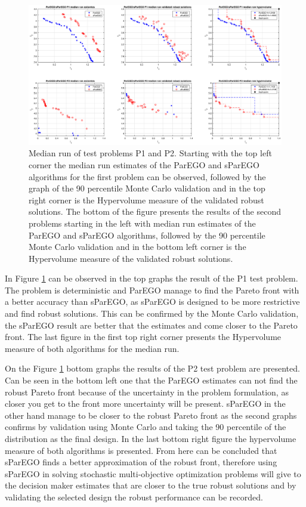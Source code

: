 \documentclass[10pt]{llncs}
\begin{document}
\begin{figure}[h]
\centering
\includegraphics[width=1.5\textwidth, center]{P1P2}
\caption{Median run of test problems P1 and P2. Starting with the top left corner the median run estimates of the ParEGO and sParEGO algorithms for the first problem can be observed, followed by the graph of the 90 percentile Monte Carlo validation and in the top right corner is the Hypervolume measure of the validated robust solutions. The bottom of the figure presents the results of the second problems starting in the left with median run estimates of the ParEGO and sParEGO algorithms, followed by the 90 percentile Monte Carlo validation and in the bottom left corner is the Hypervolume measure of the validated robust solutions.}
\label{fig:MedianRun}
\end{figure}

In Figure \ref{fig:MedianRun} can be observed in the top graphs the result of the P1 test problem. The problem is deterministic and ParEGO manage to find the Pareto front with a better accuracy than sParEGO, as sParEGO is designed to be more restrictive and find robust solutions. This can be confirmed by the Monte Carlo validation, the sParEGO result are better that the estimates and come closer to the Pareto front. The last figure in the first top right corner presents the Hypervolume measure of both algorithms for the median run.

On the Figure \ref{fig:MedianRun} bottom graphs the results of the P2 test problem are presented. Can be seen in the bottom left one that the ParEGO estimates can not find the robust Pareto front because of the uncertainty in the problem formulation, as closer you get to the front more uncertainty will be present. sParEGO in the other hand manage to be closer to the robust Pareto front as the second graphs confirms by validation using Monte Carlo and taking the 90 percentile of the distribution as the final design. In the last bottom right figure the hypervolume measure of both algorithms is presented. From here can be concluded that sParEGO finds a better approximation of the robust front, therefore using sParEGO in solving stochastic multi-objective optimization problems will give to the decision maker estimates that are closer to the true robust solutions and by validating the selected design the robust performance can be recorded.
    
\end{document}

